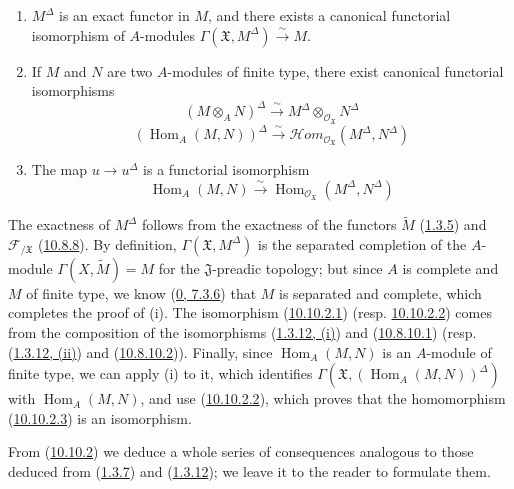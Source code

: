 \begin{proposition}[10.10.2]
\label{I.10.10.2}
\medskip\noindent
\begin{enumerate}
  \item[\rm{(i)}] $M^\Delta$ is an exact functor in $M$, and there exists
    a canonical functorial isomorphism of $A$-modules
    $\Gamma(\mathfrak{X},M^\Delta)\xrightarrow{\sim}M$.
  \item[\rm{(ii)}] If $M$ and $N$ are two $A$-modules of finite type,
    there exist canonical functorial isomorphisms
    \[
      (M\otimes_A N)^\Delta
      \xrightarrow{\sim}
      M^\Delta\otimes_{\mathscr{O}_{\mathfrak{X}}}N^\Delta
      \tag{10.10.2.1}\label{I.10.10.2.1}
    \]
    \[
      (\operatorname{Hom}_A(M,N))^\Delta
      \xrightarrow{\sim}
      \mathscr{H}\!om_{\mathscr{O}_{\mathfrak{X}}}
      (M^\Delta,N^\Delta)
      \tag{10.10.2.2}\label{I.10.10.2.2}
    \]
  \item[\rm{(iii)}] The map $u\to u^\Delta$ is a functorial
    isomorphism
    \[
      \operatorname{Hom}_A(M,N)
      \xrightarrow{\sim}
      \operatorname{Hom}_{\mathscr{O}_{\mathfrak{X}}}
      (M^\Delta,N^\Delta)
      \tag{10.10.2.3}\label{I.10.10.2.3}
    \]
\end{enumerate}
\end{proposition}

The exactness of $M^\Delta$ follows from the exactness of the functors
$\widetilde M$ (\hyperref[I.1.3.5]{1.3.5}) and
$\mathscr{F}_{/\mathfrak{X}}$ (\hyperref[I.10.8.8]{10.8.8}). By
definition, $\Gamma(\mathfrak{X},M^\Delta)$ is the separated completion
of the $A$-module $\Gamma(X,\widetilde M)=M$ for the
$\mathfrak{J}$-preadic topology; but since $A$ is complete and $M$ of
finite type, we know (\hyperref[0.7.3.6]{0, 7.3.6}) that $M$ is
separated and complete, which completes the proof of (i). The isomorphism
(\hyperref[I.10.10.2.1]{10.10.2.1}) (resp.
\hyperref[I.10.10.2.2]{10.10.2.2}) comes from the composition of the
isomorphisms (\hyperref[I.1.3.12]{1.3.12, (i)}) and
(\hyperref[I.10.8.10.1]{10.8.10.1}) (resp.
(\hyperref[I.1.3.12]{1.3.12, (ii)}) and
(\hyperref[I.10.8.10.2]{10.8.10.2})). Finally, since
$\operatorname{Hom}_A(M,N)$ is an $A$-module of finite type, we can
apply (i) to it, which identifies
$\Gamma(\mathfrak{X},(\operatorname{Hom}_A(M,N))^\Delta)$ with
$\operatorname{Hom}_A(M,N)$, and use
(\hyperref[I.10.10.2.2]{10.10.2.2}), which proves that the
homomorphism (\hyperref[I.10.10.2.3]{10.10.2.3}) is an
isomorphism.

From (\hyperref[I.10.10.2]{10.10.2}) we deduce a whole series of
consequences analogous to those deduced from
(\hyperref[I.1.3.7]{1.3.7}) and
(\hyperref[I.1.3.12]{1.3.12}); we leave it to the reader to
formulate them.

